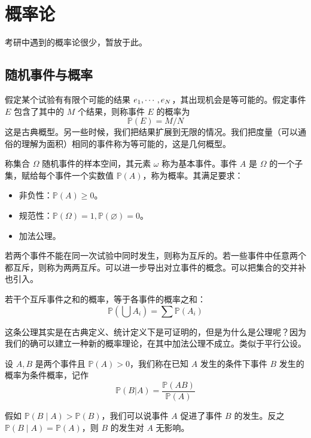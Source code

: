 \chapter{概率论}

\newcommand{\bbP}{\mathbb{P}}

考研中遇到的概率论很少，暂放于此。

\section{随机事件与概率}

假定某个试验有有限个可能的结果 $e_1,\cdots,e_N$，其出现机会是等可能的。假定事件 $E$ 包含了其中的 $M$ 个结果，则称事件 $E$ 的概率为
\[ \bbP(E) = M / N \]
这是古典概型。另一些时候，我们把结果扩展到无限的情况。我们把度量（可以通俗的理解为面积）相同的事件称为等可能的，这是几何概型。

称集合 $\Omega$ 随机事件的样本空间，其元素 $\omega$ 称为基本事件。事件 $A$ 是 $\Omega$ 的一个子集，赋给每个事件一个实数值 $\bbP(A)$，称为概率。其满足要求：

\begin{itemize}
	\item 非负性：$\bbP(A) \geqslant 0$。
	\item 规范性：$\bbP(\Omega) = 1, \bbP(\varnothing) = 0$。
	\item 加法公理。
\end{itemize}

若两个事件不能在同一次试验中同时发生，则称为互斥的。若一些事件中任意两个都互斥，则称为两两互斥。可以进一步导出对立事件的概念。可以把集合的交并补也引入。

\begin{theorem}[加法公理]
	若干个互斥事件之和的概率，等于各事件的概率之和：
	\[ \bbP\left(\bigcup A_i\right) = \sum \bbP(A_i) \]
\end{theorem}

\begin{note}
	这条公理其实是在古典定义、统计定义下是可证明的，但是为什么是公理呢？因为我们的确可以建立一种新的概率理论，在其中加法公理不成立。类似于平行公设。
\end{note}

\begin{definition}
	设 $A,B$ 是两个事件且 $\bbP(A) > 0$，我们称在已知 $A$ 发生的条件下事件 $B$ 发生的概率为条件概率，记作
	\[ \bbP(B | A) = \frac{\bbP(AB)}{\bbP(A)} \]
\end{definition}

假如 $\bbP(B \mid A) > \bbP(B)$，我们可以说事件 $A$ 促进了事件 $B$ 的发生。反之 $\bbP(B \mid A) = \bbP(A)$，则 $B$ 的发生对 $A$ 无影响。


